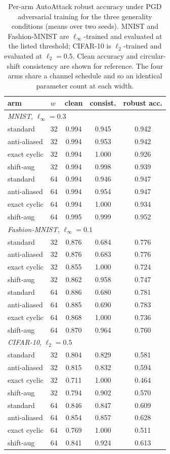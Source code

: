 \documentclass{article}
\theoremstyle{definition}
\begin{document}
\begin{table}[h]\centering
\caption{Per-arm AutoAttack robust accuracy under PGD adversarial training for the three generality conditions (means over two seeds). MNIST and Fashion-MNIST are $\ell_\infty$-trained and evaluated at the listed threshold; CIFAR-10 is $\ell_2$-trained and evaluated at $\ell_2=0.5$. Clean accuracy and circular-shift consistency are shown for reference. The four arms share a channel schedule and so an identical parameter count at each width.}
\label{tab:at-perarm}
\small
\begin{tabular}{ll ccc}
\toprule
arm & $w$ & clean & consist. & robust acc. \\
\midrule
\multicolumn{5}{l}{\emph{MNIST}, $\ell_\infty=0.3$} \\
standard & 32 & 0.994 & 0.945 & 0.942 \\
anti-aliased & 32 & 0.994 & 0.953 & 0.942 \\
exact cyclic & 32 & 0.994 & 1.000 & 0.926 \\
shift-aug & 32 & 0.994 & 0.998 & 0.939 \\
standard & 64 & 0.994 & 0.946 & 0.947 \\
anti-aliased & 64 & 0.994 & 0.954 & 0.947 \\
exact cyclic & 64 & 0.994 & 1.000 & 0.934 \\
shift-aug & 64 & 0.995 & 0.999 & 0.952 \\
\midrule
\multicolumn{5}{l}{\emph{Fashion-MNIST}, $\ell_\infty=0.1$} \\
standard & 32 & 0.876 & 0.684 & 0.776 \\
anti-aliased & 32 & 0.876 & 0.683 & 0.776 \\
exact cyclic & 32 & 0.855 & 1.000 & 0.724 \\
shift-aug & 32 & 0.862 & 0.958 & 0.747 \\
standard & 64 & 0.886 & 0.680 & 0.781 \\
anti-aliased & 64 & 0.885 & 0.690 & 0.783 \\
exact cyclic & 64 & 0.868 & 1.000 & 0.736 \\
shift-aug & 64 & 0.870 & 0.964 & 0.760 \\
\midrule
\multicolumn{5}{l}{\emph{CIFAR-10}, $\ell_2=0.5$} \\
standard & 32 & 0.804 & 0.829 & 0.581 \\
anti-aliased & 32 & 0.815 & 0.832 & 0.594 \\
exact cyclic & 32 & 0.711 & 1.000 & 0.464 \\
shift-aug & 32 & 0.794 & 0.902 & 0.570 \\
standard & 64 & 0.846 & 0.847 & 0.609 \\
anti-aliased & 64 & 0.854 & 0.857 & 0.628 \\
exact cyclic & 64 & 0.769 & 1.000 & 0.511 \\
shift-aug & 64 & 0.841 & 0.924 & 0.613 \\
\bottomrule
\end{tabular}
\end{table}
\end{document}

